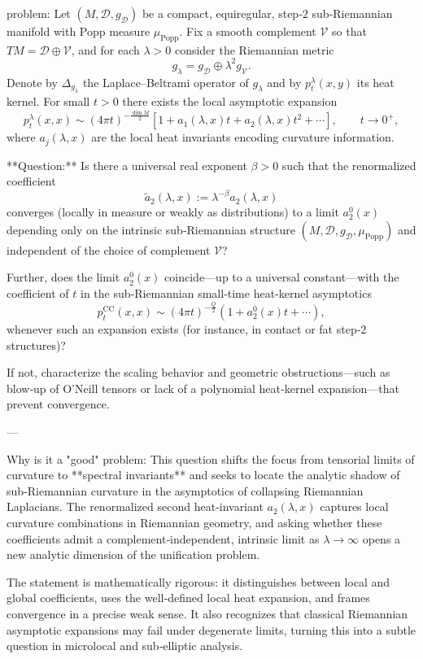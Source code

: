 problem:  
Let \((M,\mathcal{D},g_{\mathcal{D}})\) be a compact, equiregular, step‑\(2\) sub‑Riemannian manifold with Popp measure \(\mu_{\mathrm{Popp}}\).  
Fix a smooth complement \(\mathcal{V}\) so that \(TM=\mathcal{D}\oplus\mathcal{V}\), and for each \(\lambda>0\) consider the Riemannian metric  
\[
g_\lambda=g_{\mathcal{D}}\oplus \lambda^{2}g_{\mathcal{V}}.
\]
Denote by \(\Delta_{g_\lambda}\) the Laplace–Beltrami operator of \(g_{\lambda}\) and by \(p_{t}^{\lambda}(x,y)\) its heat kernel. For small \(t>0\) there exists the local asymptotic expansion  
\[
p_{t}^{\lambda}(x,x)\sim (4\pi t)^{-\frac{\dim M}{2}}
\left[1+a_1(\lambda,x) t+a_2(\lambda,x)t^2+\cdots\right],\qquad t\to0^+,
\]
where \(a_j(\lambda,x)\) are the local heat invariants encoding curvature information.

**Question:**  
Is there a universal real exponent \(\beta>0\) such that the renormalized coefficient  
\[
\tilde a_2(\lambda,x):=\lambda^{-\beta}a_2(\lambda,x)
\]
converges (locally in measure or weakly as distributions) to a limit \(a_2^0(x)\) depending only on the intrinsic sub‑Riemannian structure \((M,\mathcal{D},g_{\mathcal{D}},\mu_{\mathrm{Popp}})\) and independent of the choice of complement \(\mathcal{V}\)?  

Further, does the limit \(a_2^0(x)\) coincide—up to a universal constant—with the coefficient of \(t\) in the sub‑Riemannian small‑time heat‑kernel asymptotics
\[
p_t^{\mathrm{CC}}(x,x)\sim (4\pi t)^{-\frac{Q}{2}}(1+a_2^0(x)t+\cdots),
\]
whenever such an expansion exists (for instance, in contact or fat step‑2 structures)?  

If not, characterize the scaling behavior and geometric obstructions—such as blow‑up of O’Neill tensors or lack of a polynomial heat‑kernel expansion—that prevent convergence.  

---

Why is it a "good" problem:  
This question shifts the focus from tensorial limits of curvature to **spectral invariants** and seeks to locate the analytic shadow of sub‑Riemannian curvature in the asymptotics of collapsing Riemannian Laplacians. The renormalized second heat‑invariant \(a_2(\lambda,x)\) captures local curvature combinations in Riemannian geometry, and asking whether these coefficients admit a complement‑independent, intrinsic limit as \(\lambda\to\infty\) opens a new analytic dimension of the unification problem.  

The statement is mathematically rigorous: it distinguishes between local and global coefficients, uses the well‑defined local heat expansion, and frames convergence in a precise weak sense. It also recognizes that classical Riemannian asymptotic expansions may fail under degenerate limits, turning this into a subtle question in microlocal and sub‑elliptic analysis.  


